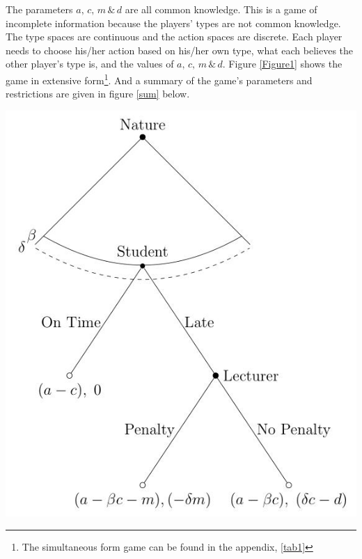 \documentclass[11pt,preprint, authoryear]{elsarticle}
\numberwithin{equation}{section}
\numberwithin{figure}{section}
\numberwithin{table}{section}
\let\rmarkdownfootnote\footnote%
\def\footnote{\protect\rmarkdownfootnote}
\begin{document}
The parameters \(a,\, c,\, m\, \&\, d\) are all common knowledge. This
is a game of incomplete information because the players' types are not
common knowledge. The type spaces are continuous and the action spaces
are discrete. Each player needs to choose his/her action based on
his/her own type, what each believes the other player's type is, and the
values of \(a,\, c,\, m\, \&\, d\). Figure \ref{Figure1} shows the game
in extensive form\footnote{The simultaneous form game can be found in
  the appendix, \ref{tab1}}. And a summary of the game's parameters and
restrictions are given in figure \ref{sum} below.

\begin{center}
\includegraphics[scale=1]{"img/continuous.jpg"}
\label{Figure1}
\end{center}
\end{document}
